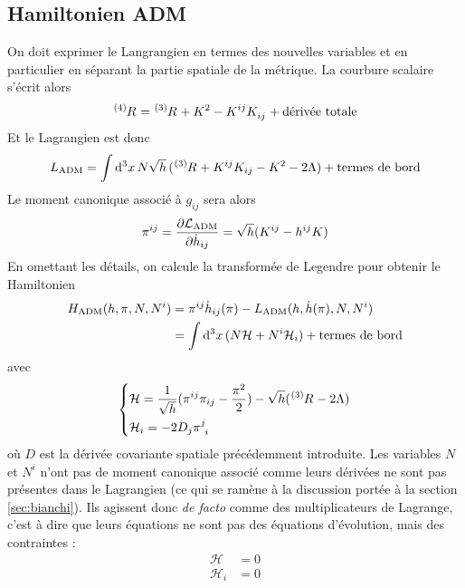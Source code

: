 \subsection{Hamiltonien ADM}
On doit exprimer le Langrangien en termes des nouvelles variables et en particulier en séparant la partie spatiale de la métrique. La courbure scalaire s'écrit alors
\begin{align}
    \tensor*[^{(4)}]{R}{} = \tensor*[^{(3)}]{R}{} + K^2 - K\indices{^i^j}K\indices{_i_j} + \text{dérivée totale}
\end{align}
Et le Lagrangien est donc 
\begin{align}
    L_\text{ADM} = \int \td^3 x \, N \sqrt{h} \, (\tensor*[^{(3)}]{R}{} + K^{ij} K_{ij} - K^2 - 2\Lambda ) +
    \text{termes de bord}
\end{align}
Le moment canonique associé à $g_{ij}$ sera alors
\begin{align}
    \pi^{ij} = \frac{\partial \mathcal{L}_\text{ADM}}{\partial \dot{h}_{ij}} = \sqrt{h} (K^{ij} - h^{ij} K)
\end{align}
En omettant les détails, on calcule la transformée de Legendre pour obtenir le Hamiltonien
\begin{align}
    H_\text{ADM}(h,\pi,N,N^i) &= \pi^{ij} \dot{h}_{ij}(\pi)- L_\text{ADM}(h,\dot{h}(\pi),N,N^i)\\
    &=  \int \mathrm{d}^3 x \, (N \mathcal{H} + N^i\mathcal{H}_i) + \text{termes de bord}
\end{align}
avec
\begin{align}
    \label{eq:hamiltonien ADM}
    \begin{dcases}
        \mathcal{H} = \frac{1}{\sqrt{h}} (\pi^{ij} \pi_{ij} - \frac{\pi^2}{2}) - \sqrt{h} (\tensor*[^{(3)}]{R}{} - 2 \Lambda)\\
        \mathcal{H}_i = - 2 D_j \pi\indices{^j_i}
    \end{dcases}
\end{align}
où $D$ est la dérivée covariante spatiale précédemment introduite. Les variables $N$ et $N^i$ n'ont pas de moment canonique associé comme leurs dérivées ne sont pas présentes dans le Lagrangien (ce qui se ramène à la discussion portée à la section \ref{sec:bianchi}). Ils agissent donc \emph{de facto} comme des multiplicateurs de Lagrange, c'est à dire que leurs équations ne sont pas des équations d'évolution, mais des contraintes :
\begin{align}
    \mathcal{H} &= 0\\
    \mathcal{H}_i &= 0
\end{align}
